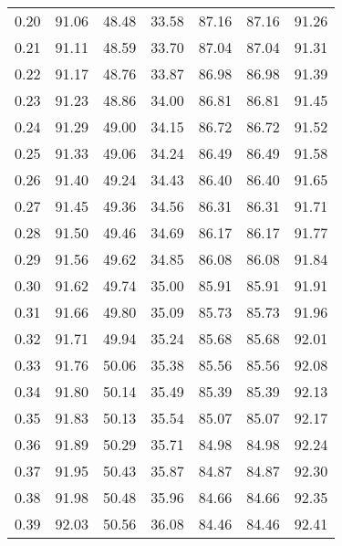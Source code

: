\begin{tabular}{|c|c|c|c|c|c|c|}
      0.20 &     91.06 &     48.48 &      33.58 &   87.16 &      87.16 &         91.26 \\
      0.21 &     91.11 &     48.59 &      33.70 &   87.04 &      87.04 &         91.31 \\
      0.22 &     91.17 &     48.76 &      33.87 &   86.98 &      86.98 &         91.39 \\
      0.23 &     91.23 &     48.86 &      34.00 &   86.81 &      86.81 &         91.45 \\
      0.24 &     91.29 &     49.00 &      34.15 &   86.72 &      86.72 &         91.52 \\
      0.25 &     91.33 &     49.06 &      34.24 &   86.49 &      86.49 &         91.58 \\
      0.26 &     91.40 &     49.24 &      34.43 &   86.40 &      86.40 &         91.65 \\
      0.27 &     91.45 &     49.36 &      34.56 &   86.31 &      86.31 &         91.71 \\
      0.28 &     91.50 &     49.46 &      34.69 &   86.17 &      86.17 &         91.77 \\
      0.29 &     91.56 &     49.62 &      34.85 &   86.08 &      86.08 &         91.84 \\
      0.30 &     91.62 &     49.74 &      35.00 &   85.91 &      85.91 &         91.91 \\
      0.31 &     91.66 &     49.80 &      35.09 &   85.73 &      85.73 &         91.96 \\
      0.32 &     91.71 &     49.94 &      35.24 &   85.68 &      85.68 &         92.01 \\
      0.33 &     91.76 &     50.06 &      35.38 &   85.56 &      85.56 &         92.08 \\
      0.34 &     91.80 &     50.14 &      35.49 &   85.39 &      85.39 &         92.13 \\
      0.35 &     91.83 &     50.13 &      35.54 &   85.07 &      85.07 &         92.17 \\
      0.36 &     91.89 &     50.29 &      35.71 &   84.98 &      84.98 &         92.24 \\
      0.37 &     91.95 &     50.43 &      35.87 &   84.87 &      84.87 &         92.30 \\
      0.38 &     91.98 &     50.48 &      35.96 &   84.66 &      84.66 &         92.35 \\
      0.39 &     92.03 &     50.56 &      36.08 &   84.46 &      84.46 &         92.41 \\

\end{tabular}
